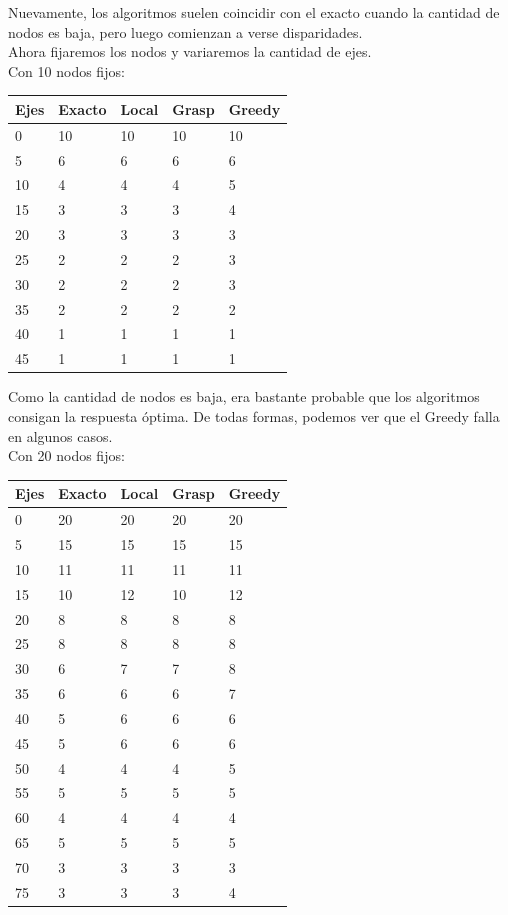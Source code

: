 Nuevamente, los algoritmos suelen coincidir con el exacto cuando la cantidad de nodos es baja, pero luego comienzan a verse disparidades.\\

Ahora fijaremos los nodos y variaremos la cantidad de ejes.\\

Con 10 nodos fijos:\\
\begin{tabular}{| l | l | l | l | l |}
 \hline
Ejes&Exacto&Local&Grasp&Greedy \\ \hline
0&10&10&10&10 \\ \hline
5&6&6&6&6 \\ \hline
10&4&4&4&5 \\ \hline
15&3&3&3&4 \\ \hline
20&3&3&3&3 \\ \hline
25&2&2&2&3 \\ \hline
30&2&2&2&3 \\ \hline
35&2&2&2&2 \\ \hline
40&1&1&1&1 \\ \hline
45&1&1&1&1 \\ \hline
\end{tabular}

Como la cantidad de nodos es baja, era bastante probable que los algoritmos consigan la respuesta \'optima. De todas formas, podemos ver que el Greedy falla en algunos casos.\\

Con 20 nodos fijos:\\
\begin{tabular}{| l | l | l | l | l |}
 \hline
Ejes&Exacto&Local&Grasp&Greedy \\ \hline
0&20&20&20&20 \\ \hline
5&15&15&15&15 \\ \hline
10&11&11&11&11 \\ \hline
15&10&12&10&12 \\ \hline
20&8&8&8&8 \\ \hline
25&8&8&8&8 \\ \hline
30&6&7&7&8 \\ \hline
35&6&6&6&7 \\ \hline
40&5&6&6&6 \\ \hline
45&5&6&6&6 \\ \hline
50&4&4&4&5 \\ \hline
55&5&5&5&5 \\ \hline
60&4&4&4&4 \\ \hline
65&5&5&5&5 \\ \hline
70&3&3&3&3 \\ \hline
75&3&3&3&4 \\ \hline
\end{tabular}\\

